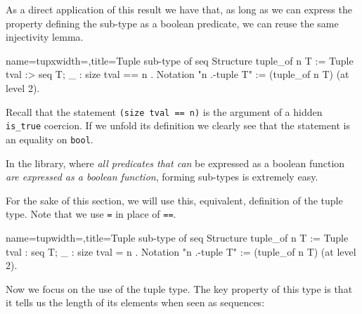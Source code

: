 As a direct application of this result we have that, as long as we can
express the property defining the sub-type as a boolean predicate,
we can reuse the same injectivity lemma.

\begin{coq}{name=tupx}{width=\textwidth,title=Tuple sub-type of seq}
Structure tuple_of n T :=  Tuple { tval :> seq T; _ : size tval == n }.
Notation "n .-tuple T" := (tuple_of n T) (at level 2).
\end{coq}

Recall that the statement \lstinline/(size tval == n)/
is the argument of a hidden \lstinline/is_true/ coercion.
If we unfold its definition we clearly see that the statement
is an equality on \lstinline/bool/.

In the \mcbMC{} library, where \emph{all predicates that can} be
expressed as a boolean function \emph{are expressed as a boolean
function}, forming sub-types is extremely easy.

%


For the sake of this section, we will use this, equivalent, definition
of the tuple type.  Note that we use \lstinline/=/ in place of
\lstinline/==/.

\begin{coq}{name=tup}{width=\textwidth,title=Tuple sub-type of seq}
Structure tuple_of n T := Tuple { tval : seq T; _ : size tval = n }.
Notation "n .-tuple T" := (tuple_of n T) (at level 2).
\end{coq}


Now we focus on the use of the tuple type.  The key property of this
type is that it tells us the length of its elements when seen as
sequences:

